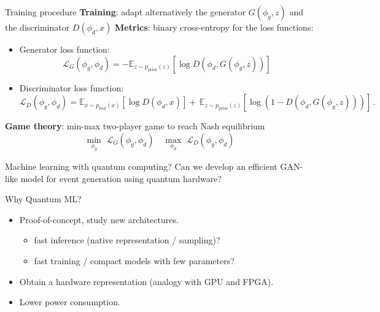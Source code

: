 \documentclass[11pt,aspectratio=169]{beamer}
\begin{document}
\begin{frame}{Training procedure}
    \textbf{Training}: adapt alternatively the generator $G(\phi_g , z)$ and the discriminator $D(\phi_d , x)$
    \textbf{Metrics}: binary cross-entropy for the loss functions:
    \begin{itemize}
        \item Generator loss function:
        $$ \mathcal{L}_G(\phi_g,\phi_d) = -\mathbb{E}_{z \sim p_{\mathrm{prior}}(z)}[\log D(\phi_d,G(\phi_g,z))]  $$
        \item Discriminator loss function:
        $$ \mathcal{L}_D(\phi_g,\phi_d) = \mathbb{E}_{x \sim p_{\mathrm{real}}(x)}[\log D(\phi_d,x)] +\, \mathbb{E}_{z \sim p_{\mathrm{prior}}(z)}[\log (1-D(\phi_d,G(\phi_g,z)))]\,.$$
    \end{itemize}
 
    \textbf{Game theory}: min-max two-player game to reach Nash equilibrium
    $$ \underset{\phi_g}{\min}\,\,\mathcal{L}_G(\phi_g,\phi_d)  \quad  \underset{\phi_d}{\max}\,\,\mathcal{L}_D(\phi_g,\phi_d) $$
   

   
\end{frame}

\begin{frame}{Machine learning with quantum computing?}
    Can we develop an efficient GAN-like model for event generation using quantum hardware?
    
    Why Quantum ML?
    \begin{itemize}
        \item Proof-of-concept, study new architectures. 
        \begin{itemize}
            \item fast inference (native representation / sampling)?
            \item fast training / compact models with few parameters?
        \end{itemize}
        \item Obtain a hardware representation (analogy with GPU and FPGA).
        \item Lower power consumption.
    \end{itemize}

\end{frame}
\end{document}
